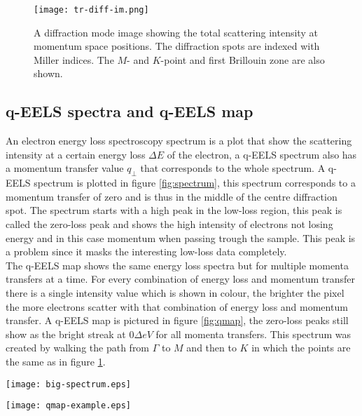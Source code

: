 \begin{figure}
	\centering
	\texttt{[image: tr-diff-im.png]}
	\caption{A diffraction mode image showing the total scattering intensity at momentum space positions. The diffraction spots are indexed with Miller indices. The $M$- and $K$-point and first Brillouin zone are also shown.}
	\label{fig:tr-diff-im}
\end{figure}



\subsection{q-EELS spectra and q-EELS map}
An electron energy loss spectroscopy spectrum is a plot that show the scattering intensity at a certain energy loss $\Delta E$ of the electron, a q-EELS spectrum also has a momentum transfer value $q_{\perp}$ that corresponds to the whole spectrum. A q-EELS spectrum is plotted in figure \ref{fig:spectrum}, this spectrum corresponds to a momentum transfer of zero and is thus in the middle of the centre diffraction spot. The spectrum starts with a high peak in the low-loss region, this peak is called the zero-loss peak and shows the high intensity of electrons not losing energy and in this case momentum when passing trough the sample. This peak is a problem since it masks the interesting low-loss data completely.\\
The q-EELS map shows the same energy loss spectra but for multiple momenta transfers at a time. For every combination of energy loss and momentum transfer there is a single intensity value which is shown in colour, the brighter the pixel the more electrons scatter with that combination of energy loss and momentum transfer. A q-EELS map is pictured in figure \ref{fig:qmap}, the zero-loss peaks still show as the bright streak at $0 \Delta eV$ for all momenta transfers. This spectrum was created by walking the path from $\Gamma$ to $M$ and then to $K$ in which the points are the same as in figure \ref{fig:tr-diff-im}.

\begin{minipage}{.45\textwidth}
	\centering
	\captionsetup{width=0.8\linewidth}
	\texttt{[image: big-spectrum.eps]}
	\label{fig:spectrum}
\end{minipage}%
\begin{minipage}{.45\textwidth}
	\centering
	\captionsetup{width=0.8\linewidth}
	\texttt{[image: qmap-example.eps]}
	\label{fig:qmap}
\end{minipage}

